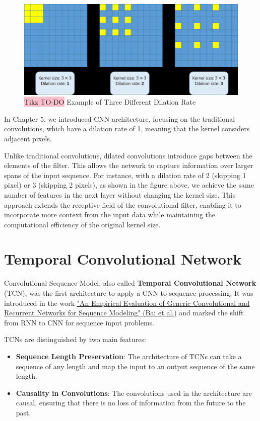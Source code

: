 \begin{figure}[!htbp]
    \centering
    \includegraphics[width=0.85\linewidth]{tikz/chapter8 - Dilation.png}
    \caption{{\color{red}\colorbox{pink}{Tikz TO-DO}} Example of Three Different Dilation Rate}
\end{figure}

In Chapter 5, we introduced CNN architecture, focusing on the traditional convolutions, which have a dilation rate of 1, meaning that the kernel considers adjacent pixels. 

Unlike traditional convolutions, dilated convolutions introduce gaps between the elements of the filter. This allows the network to capture information over larger spans of the input sequence. For instance, with a dilation rate of 2 (skipping 1 pixel) or 3 (skipping 2 pixels), as shown in the figure above, we achieve the same number of features in the next layer without changing the kernel size. This approach extends the receptive field of the convolutional filter, enabling it to incorporate more context from the input data while maintaining the computational efficiency of the original kernel size.


\section{Temporal Convolutional Network}

Convolutional Sequence Model, also called \textbf{Temporal Convolutional Network} (TCN), was the first architecture to apply a CNN to sequence processing. It was introduced in the work \href{https://arxiv.org/pdf/1803.01271}{"An Empirical Evaluation of Generic Convolutional and Recurrent Networks for Sequence Modeling" (Bai et al.)} and marked the shift from RNN to CNN for sequence input problems.

TCNs are distinguished by two main features:
\begin{itemize}
    \item \textbf{Sequence Length Preservation}: The architecture of TCNs can take a sequence of any length and map the input to an output sequence of the same length.
    \item \textbf{Causality in Convolutions}: The convolutions used in the architecture are causal, ensuring that there is no loss of information from the future to the past.
\end{itemize}

